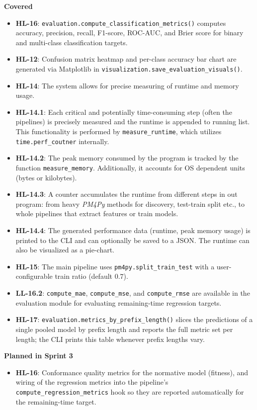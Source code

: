 \documentclass[12pt,a4paper]{article}
\newcommand{\newcov}[1]{\colorbox{green!40}{\textbf{#1}}}
\begin{document}
\textbf{Covered}
\begin{itemize}
    \item \textbf{HL-16}: \texttt{evaluation.compute\_classification\_metrics()} computes accuracy, precision, recall, F1-score, ROC-AUC, and Brier score for binary and multi-class classification targets.
    \item \textbf{HL-12}: Confusion matrix heatmap and per-class accuracy bar chart are generated via Matplotlib in \texttt{visualization.save\_evaluation\_visuals()}.
    \item \newcov{HL-14}: The system allows for precise measuring of runtime and memory usage.
    \item \newcov{HL-14.1}: Each critical and potentially time-consuming step (often the pipelines) is precisely measured and the runtime is appended to running list. This functionality is performed by \texttt{measure\_runtime}, which utilizes \texttt{time.perf\_coutner} internally.
    \item \newcov{HL-14.2}: The peak memory consumed by the program is tracked by the function \texttt{measure\_memory}. Additionally, it accounts for OS dependent units (bytes or kilobytes).
    \item \newcov{HL-14.3}: A counter accumulates the runtime from different steps in out program: from heavy \textit{PM4Py} methods for discovery, test-train split etc., to whole pipelines that extract features or train models.
    \item \newcov{HL-14.4}: The generated performance data (runtime, peak memory usage) is printed to the CLI and can optionally be saved to a JSON. The runtime can also be visualized as a pie-chart.
    \item \newcov{HL-15}: The main pipeline uses \texttt{pm4py.split\_train\_test} with a user-configurable train ratio (default $0.7$).
    \item \newcov{LL-16.2}: \texttt{compute\_mae}, \texttt{compute\_mse}, and \texttt{compute\_rmse} are available in the evaluation module for evaluating remaining-time regression targets.
    \item \newcov{HL-17}: \texttt{evaluation.metrics\_by\_prefix\_length()} slices the predictions of a single pooled model by prefix length and reports the full metric set per length; the CLI prints this table whenever prefix lengths vary.
\end{itemize}

\noindent \textbf{Planned in Sprint 3}
\begin{itemize}
    \item \textbf{HL-16}: Conformance quality metrics for the normative model (fitness), and wiring of the regression metrics into the pipeline's \texttt{compute\_regression\_metrics} hook so they are reported automatically for the remaining-time target.
\end{itemize}
\end{document}
